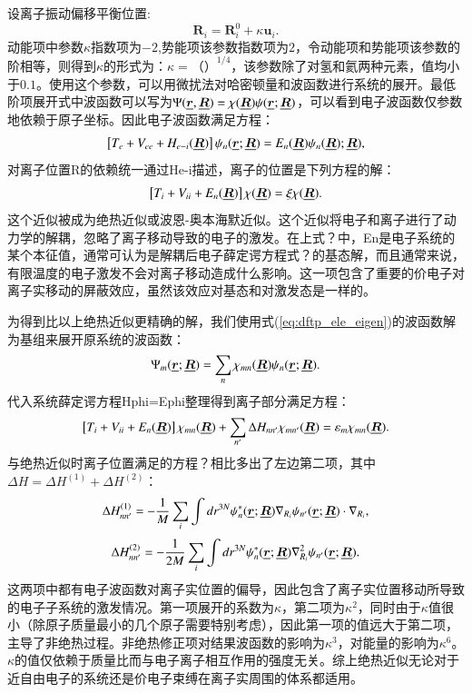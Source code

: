 \documentclass[phd,nobackinfo]{scutthesis}
\begin{document}
设离子振动偏移平衡位置:
\begin{equation}
  \bm{R}_i = \bm{R}^0_i + \kappa \bm{u}_i.
\end{equation}
动能项中参数$\kappa$指数项为$-2$,势能项该参数指数项为$2$，令动能项和势能项该参数的阶相等，则得到$\kappa$的形式为：$\kappa=（）^{1/4}$，该参数除了对氢和氦两种元素，值均小于$0.1$。使用这个参数，可以用微扰法对哈密顿量和波函数进行系统的展开。最低阶项展开式中波函数可以写为$\Psi(\underline{\bm{r}},\underline{\bm{R}})=\chi(\underline{\bm{R}})\psi(\underline{\bm{r}};\underline{\bm{R}})$，可以看到电子波函数仅参数地依赖于原子坐标。因此电子波函数满足方程：
\begin{equation}\label{eq:dftp_ele_eigen}
  \left[ T_e + V_{ee} + H_{e-i}(\underline{\bm{R}}) \right]\psi_n(\underline{\bm{r}};\underline{\bm{R}}) = E_n(\underline{\bm{R}})\psi_n(\underline{\bm{R}}); \underline{\bm{R}}),
\end{equation}
对离子位置R的依赖统一通过He-i描述，离子的位置是下列方程的解：
\begin{equation}
  \left[ T_i + V_{ii} + E_n(\underline{\bm{R}}) \right] \chi(\underline{\bm{R}}) = \xi \chi(\underline{\bm{R}}).
\end{equation}
这个近似被成为绝热近似或波恩-奥本海默近似。这个近似将电子和离子进行了动力学的解耦，忽略了离子移动导致的电子的激发。在上式？中，En是电子系统的某个本征值，通常可认为是解耦后电子薛定谔方程式？的基态解，而且通常来说，有限温度的电子激发不会对离子移动造成什么影响。这一项包含了重要的价电子对离子实移动的屏蔽效应，虽然该效应对基态和对激发态是一样的。

为得到比以上绝热近似更精确的解，我们使用式(\ref{eq:dftp_ele_eigen})的波函数解为基组来展开原系统的波函数：
\begin{equation}
  \Psi_m(\underline{\bm{r}};\underline{\bm{R}}) = \sum_n \chi_{mn}(\underline{\bm{R}})\psi_n(\underline{\bm{r}};\underline{\bm{R}}).
\end{equation}
代入系统薛定谔方程Hphi=Ephi整理得到离子部分满足方程：
\begin{equation}
  \left[ T_i + V_{ii} + E_n(\underline{\bm{R}}) \right] \chi_{mn}(\underline{\bm{R}}) + \sum_{n'}\Delta H_{nn'}\chi_{mn'}(\underline{\bm{R}}) = \varepsilon_m \chi_{mn} (\underline{\bm{R}}).
\end{equation}
与绝热近似时离子位置满足的方程？相比多出了左边第二项，其中$\Delta H=\Delta H^{(1)} + \Delta H^{(2)}$：
\begin{equation}
  \Delta H_{nn'}^{(1)} = -\frac{1}{M}\sum_i \int dr^{3N}\psi_n^*(\underline{\bm{r}};\underline{\bm{R}})\nabla_{R_i}\psi_{n'}(\underline{\bm{r}};\underline{\bm{R}})\cdot \nabla_{R_i},
\end{equation}
\begin{equation}
  \Delta H_{nn'}^{(2)} = -\frac{1}{2M}\sum_i \int dr^{3N}\psi_n^*(\underline{\bm{r}};\underline{\bm{R}})\nabla^2_{R_i}\psi_{n'}(\underline{\bm{r}};\underline{\bm{R}}).
\end{equation}
这两项中都有电子波函数对离子实位置的偏导，因此包含了离子实位置移动所导致的电子子系统的激发情况。第一项展开的系数为$\kappa$，第二项为$\kappa^2$，同时由于$\kappa$值很小（除原子质量最小的几个原子需要特别考虑），因此第一项的值远大于第二项，主导了非绝热过程。非绝热修正项对结果波函数的影响为$\kappa^3$，对能量的影响为$\kappa^6$。$\kappa$的值仅依赖于质量比而与电子离子相互作用的强度无关。综上绝热近似无论对于近自由电子的系统还是价电子束缚在离子实周围的体系都适用。
\end{document}
